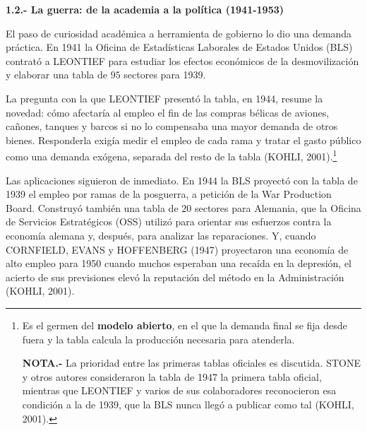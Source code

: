 \documentclass[10pt,a4paper]{article}
\begin{document}
\textbf{1.2.- La guerra: de la academia a la política (1941-1953)}

El paso de curiosidad académica a herramienta de gobierno lo dio una demanda práctica. En 1941 la Oficina de Estadísticas Laborales de Estados Unidos (BLS) contrató a LEONTIEF para estudiar los efectos económicos de la desmovilización y elaborar una tabla de $95$ sectores para 1939. 

La pregunta con la que LEONTIEF presentó la tabla, en 1944, resume la novedad: cómo afectaría al empleo el fin de las compras bélicas de aviones, cañones, tanques y barcos si no lo compensaba una mayor demanda de otros bienes. Responderla exigía medir el empleo de cada rama y tratar el gasto público como una demanda exógena, separada del resto de la tabla (KOHLI, 2001).\footnote{%
    Es el germen del \textbf{modelo abierto}, en el que la demanda final se fija desde fuera y la tabla calcula la producción necesaria para atenderla.

    \textbf{NOTA.-} La prioridad entre las primeras tablas oficiales es discutida. STONE y otros autores consideraron la tabla de 1947 la primera tabla oficial, mientras que LEONTIEF y varios de sus colaboradores reconocieron esa condición a la de 1939, que la BLS nunca llegó a publicar como tal (KOHLI, 2001).
}

Las aplicaciones siguieron de inmediato. En 1944 la BLS proyectó con la tabla de 1939 el empleo por ramas de la posguerra, a petición de la War Production Board. Construyó también una tabla de $20$ sectores para Alemania, que la Oficina de Servicios Estratégicos (OSS) utilizó para orientar sus esfuerzos contra la economía alemana y, después, para analizar las reparaciones. Y, cuando CORNFIELD, EVANS y HOFFENBERG (1947) proyectaron una economía de alto empleo para 1950 cuando muchos esperaban una recaída en la depresión, el acierto de sus previsiones elevó la reputación del método en la Administración (KOHLI, 2001).
\end{document}

